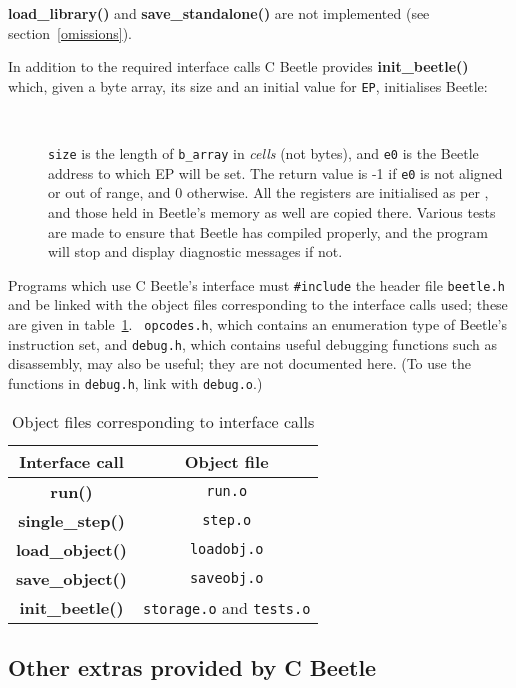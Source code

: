 \documentclass{article}
\newlength{\ifacewidth}\ifacewidth=\textwidth \advance\ifacewidth by -0.1in
\newlength{\innerwidth}\innerwidth=\ifacewidth \advance\innerwidth by -0.5in
\newcommand{\ifacec}[2]{\item[]\parbox{\ifacewidth}{\hspace*{2.5mm}{\tt #1}\\[0.5ex]\hspace*{0.4in}\parbox{\innerwidth}{#2}}}
\begin{document}
{\bf load\_library()} and {\bf save\_standalone()} are not implemented (see
section~\ref{omissions}).

In addition to the required interface calls C Beetle provides {\bf
init\_beetle()} which, given a byte array, its size and an initial value for
{\tt EP}, initialises Beetle:

\begin{description}
\ifacec{int init\_beetle(BYTE *b\_array, long size, UCELL e0)}{{\tt size} is
the length of {\tt b\_array} in {\em cells} (not bytes), and {\tt e0} is the
Beetle address to which EP will be set. The return value is -1 if {\tt e0} is
not aligned or out of range, and 0 otherwise. All the registers are
initialised as per \cite{beetle}, and those held in Beetle's memory as well
are copied there. Various tests are made to ensure that Beetle has compiled
properly, and the program will stop and display diagnostic messages if not.}
\end{description}

Programs which use C Beetle's interface must {\tt \#include} the header file
{\tt beetle.h} and be linked with the object files corresponding to the
interface calls used; these are given in table~\ref{objtable}. {\tt
opcodes.h}, which contains an enumeration type of Beetle's instruction set,
and {\tt debug.h}, which contains useful debugging functions such as
disassembly, may also be useful; they are not documented here. (To use the
functions in {\tt debug.h}, link with {\tt debug.o}.)

\begin{table}
\begin{center}
\begin{tabular}{|c|c|} \hline
\rule[-2mm]{0mm}{6mm}\bf Interface call & \bf Object file \\ \hline
{\bf run()} & {\tt run.o} \\
{\bf single\_step()} & {\tt step.o} \\
{\bf load\_object()} & {\tt loadobj.o} \\
{\bf save\_object()} & {\tt saveobj.o} \\
{\bf init\_beetle()} & {\tt storage.o} and {\tt tests.o} \\  \hline
\end{tabular}
\caption{\label{objtable}Object files corresponding to interface calls}
\end{center}
\end{table}


\subsection{Other extras provided by C Beetle}
\end{document}
